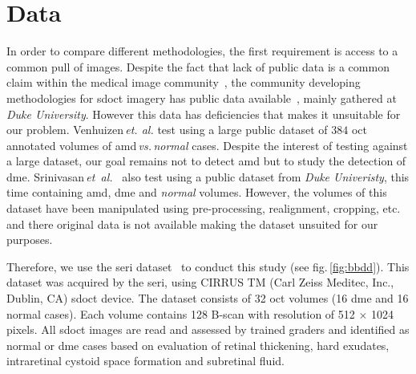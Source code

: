 \graphicspath{ {./content/method/figures/} }

\section{Data}\label{sec:data}
In order to compare different methodologies, the first requirement is access to a common pull of images.
Despite the fact that lack of public data is a common claim within the medical image community~\cite{giger2008anniversary}, the community developing methodologies for \gls{sdoct} imagery has public data available~\cite{farsiu2014quantitative,Srinivasan2014}, mainly gathered at \emph{Duke University}.
However this data has deficiencies that makes it unsuitable for our problem.
Venhuizen\,\emph{et. al.} test using a large public dataset of $384$ \gls{oct} annotated volumes of \gls{amd}\,\emph{vs.\,normal} cases.
Despite the interest of testing against a large dataset, our goal remains not to detect \gls{amd} but to study the detection of \gls{dme}.
Srinivasan\,\textit{et~al.}~\cite{Srinivasan2014} also test using a public dataset from \emph{Duke Univeristy}, this time containing \gls{amd}, \gls{dme} and \emph{normal} volumes.
However, the volumes of this dataset have been manipulated using pre-processing, realignment, cropping, etc. and there original data is not available making the dataset unsuited for our purposes.

Therefore, we use the \gls{seri} dataset~\cite{seri2016apr-repoICPR} to conduct this study (see fig.\,\ref{fig:bbdd}).
This dataset was acquired by the \gls{seri}, using CIRRUS TM (Carl Zeiss Meditec, Inc., Dublin, CA) \gls{sdoct} device.
The dataset consists of 32 \gls{oct} volumes (16 \gls{dme} and 16 normal cases).
Each volume contains 128 B-scan with resolution of 512 $\times$ 1024 pixels.  All \gls{sdoct} images are read and assessed by trained graders and identified as normal or \gls{dme} cases based on evaluation of retinal thickening, hard exudates, intraretinal cystoid space formation and subretinal fluid.

